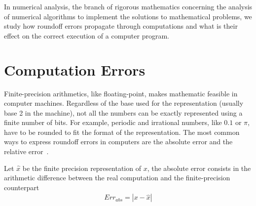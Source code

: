 In numerical analysis, the branch of rigorous mathematics concerning the analysis of numerical algorithms to implement the solutions to mathematical problems, we study how roundoff errors propagate through computations and what is their effect on the correct execution of a computer program. 

%

%
%
%
%
\section{Computation Errors}
%

Finite-precision arithmetics, like floating-point, makes mathematic feasible in computer machines. 
%
Regardless of the base used for the representation (usually base 2 in the machine), not all the numbers can be exactly represented using a finite number of bits.
%
For example, periodic and irrational numbers, like $0.1$ or $\pi$, have to be rounded to fit the format of the representation. 
%
%
%
The most common ways to express roundoff errors in computers are the absolute error and the relative error~\cite{higham2002accuracy}.
%

Let $\widehat{x}$ be the finite precision representation of $x$, the absolute error consists in the arithmetic difference between the real computation and the finite-precision counterpart
%
\begin{align}
Err_{abs}=|x-\widehat{x}|\label{absolute}
\end{align}
%

